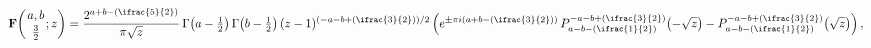 \[\mathop{\mathbf{F}\/}\nolimits\!\left({a,b\atop\tfrac{3}{2}};z\right)=\frac{2^%
{a+b-(\ifrac{5}{2})}}{\pi\sqrt{z}}\mathop{\Gamma\/}\nolimits\!\left(a-\tfrac{1%
}{2}\right)\mathop{\Gamma\/}\nolimits\!\left(b-\tfrac{1}{2}\right)\*(z-1)^{(-a%
-b+(\ifrac{3}{2}))/2}\*\left(e^{\pm\pi i(a+b-(\ifrac{3}{2}))}\mathop{P^{-a-b+(%
\ifrac{3}{2})}_{a-b-(\ifrac{1}{2})}\/}\nolimits\!\left(-\sqrt{z}\right)-%
\mathop{P^{-a-b+(\ifrac{3}{2})}_{a-b-(\ifrac{1}{2})}\/}\nolimits\!\left(\sqrt{%
z}\right)\right),\]